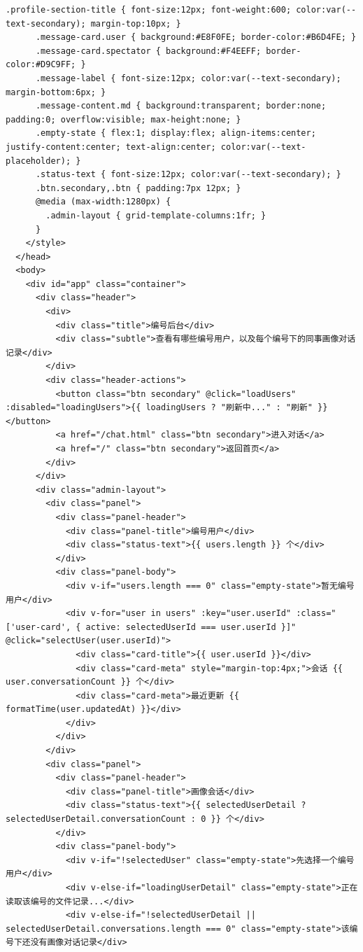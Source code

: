 \documentclass[12pt,a4paper]{article}
\begin{document}
\newpage
{}
\fancyhead[R]{}
\begin{Verbatim}[fontsize=\footnotesize]
      .profile-section-title { font-size:12px; font-weight:600; color:var(--text-secondary); margin-top:10px; }
      .message-card.user { background:#E8F0FE; border-color:#B6D4FE; }
      .message-card.spectator { background:#F4EEFF; border-color:#D9C9FF; }
      .message-label { font-size:12px; color:var(--text-secondary); margin-bottom:6px; }
      .message-content.md { background:transparent; border:none; padding:0; overflow:visible; max-height:none; }
      .empty-state { flex:1; display:flex; align-items:center; justify-content:center; text-align:center; color:var(--text-placeholder); }
      .status-text { font-size:12px; color:var(--text-secondary); }
      .btn.secondary,.btn { padding:7px 12px; }
      @media (max-width:1280px) {
        .admin-layout { grid-template-columns:1fr; }
      }
    </style>
  </head>
  <body>
    <div id="app" class="container">
      <div class="header">
        <div>
          <div class="title">编号后台</div>
          <div class="subtle">查看有哪些编号用户，以及每个编号下的同事画像对话记录</div>
        </div>
        <div class="header-actions">
          <button class="btn secondary" @click="loadUsers" :disabled="loadingUsers">{{ loadingUsers ? "刷新中..." : "刷新" }}</button>
          <a href="/chat.html" class="btn secondary">进入对话</a>
          <a href="/" class="btn secondary">返回首页</a>
        </div>
      </div>
      <div class="admin-layout">
        <div class="panel">
          <div class="panel-header">
            <div class="panel-title">编号用户</div>
            <div class="status-text">{{ users.length }} 个</div>
          </div>
          <div class="panel-body">
            <div v-if="users.length === 0" class="empty-state">暂无编号用户</div>
            <div v-for="user in users" :key="user.userId" :class="['user-card', { active: selectedUserId === user.userId }]" @click="selectUser(user.userId)">
              <div class="card-title">{{ user.userId }}</div>
              <div class="card-meta" style="margin-top:4px;">会话 {{ user.conversationCount }} 个</div>
              <div class="card-meta">最近更新 {{ formatTime(user.updatedAt) }}</div>
            </div>
          </div>
        </div>
        <div class="panel">
          <div class="panel-header">
            <div class="panel-title">画像会话</div>
            <div class="status-text">{{ selectedUserDetail ? selectedUserDetail.conversationCount : 0 }} 个</div>
          </div>
          <div class="panel-body">
            <div v-if="!selectedUser" class="empty-state">先选择一个编号用户</div>
            <div v-else-if="loadingUserDetail" class="empty-state">正在读取该编号的文件记录...</div>
            <div v-else-if="!selectedUserDetail || selectedUserDetail.conversations.length === 0" class="empty-state">该编号下还没有画像对话记录</div>
\end{Verbatim}
\end{document}
